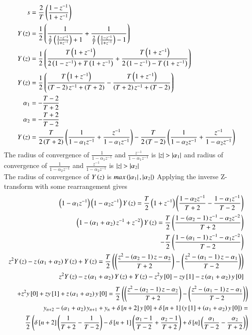 \documentclass[journal]{IEEEtran}
\begin{document}
\begin{align}
	s &= \frac{2}{T}\left(\frac{1-z^{-1}}{1+z^{-1}}\right)\\
	Y\left(z\right) &= \frac{1}{2}\left(\frac{1}{\frac{2}{T}\left(\frac{1-z^{-1}}{1+z^{-1}}\right)+1}+\frac{1}{\frac{2}{T}\left(\frac{1-z^{-1}}{1+z^{-1}}\right)-1}\right)\\
	Y\left(z\right) &= \frac{1}{2}\left(\frac{T\left(1+z^{-1}\right)}{2\left(1-z^{-1}\right)+T\left(1+z^{-1}\right)}+\frac{T\left(1+z^{-1}\right)}{2\left(1-z^{-1}\right)-T\left(1+z^{-1}\right)}\right)\\
	Y\left(z\right) &= \frac{1}{2}\left(\frac{T\left(1+z^{-1}\right)}{\left(T-2\right)z^{-1}+\left(T+2\right)} - \frac{T\left(1+z^{-1}\right)}{\left(T+2\right)z^{-1}+\left(T-2\right)}\right)\\
	\alpha_1 &= -\frac{T-2}{T+2}\\
	\alpha_2 &= -\frac{T+2}{T-2}\\ 
	Y\left(z\right) &= \frac{T}{2\left(T+2\right)}\left(\frac{1}{1-\alpha_1z^{-1}}+\frac{z^{-1}}{1-\alpha_1z^{-1}}\right)-\frac{T}{2\left(T-2\right)}\left(\frac{1}{1-\alpha_2z^{-1}}+\frac{z^{-1}}{1-\alpha_2z^{-1}}\right)
\end{align}
The radius of convergence of $\frac{1}{1-\alpha_1z^{-1}}$ and $\frac{z^{-1}}{1-\alpha_1z^{-1}}$ is $\left\vert z\right\vert>\left\vert\alpha_1\right\vert$ and radius of convergence of $\frac{1}{1-\alpha_2z^{-1}}$ and $\frac{z^{-1}}{1-\alpha_2z^{-1}}$ is $\left\vert z\right\vert>\left\vert\alpha_2\right\vert$\\
The radius of convergence of $Y\left(z\right)$ is $max\left(\left\vert\alpha_1\right\vert,\left\vert\alpha_2\right\vert\right)$\newline
Applying the inverse Z-transform with some rearrangement gives
\begin{align}
	\left(1-\alpha_1z^{-1}\right)\left(1-\alpha_2z^{-1}\right)Y\left(z\right) = \frac{T}{2}\left(1+z^{-1}\right)\left(\frac{1-\alpha_2z^{-1}}{T+2}-\frac{1-\alpha_1z^{-1}}{T-2}\right)\\
	\left(1-\left(\alpha_1+\alpha_2\right)z^{-1}+z^{-2}\right)Y\left(z\right) = \frac{T}{2}\left(\frac{1-\left(\alpha_2-1\right)z^{-1}-\alpha_2z^{-2}}{T+2}\right)\nonumber \\
  \qquad -\frac{T}{2}\left(\frac{1-\left(\alpha_1-1\right)z^{-1}-\alpha_1z^{-2}}{T-2}\right)\\
	z^2Y\left(z\right)-z\left(\alpha_1+\alpha_2\right)Y\left(z\right)+Y\left(z\right) = \frac{T}{2}\left(\left(\frac{z^2-\left(\alpha_2-1\right)z-\alpha_2}{T+2}\right)-\left(\frac{z^2-\left(\alpha_1-1\right)z-\alpha_1}{T-2}\right)\right)\\
	z^2Y\left(z\right)-z\left(\alpha_1+\alpha_2\right)Y\left(z\right)+Y\left(z\right) -z^2y{}\left[0\right] -zy{}\left[1\right] -z\left(\alpha_1+\alpha_2\right)y{}\left[0\right]\nonumber
\end{align}
\begin{align}
  \qquad+z^2y{}\left[0\right]+zy{}\left[1\right]+z\left(\alpha_1+\alpha_2\right)y{}\left[0\right] = \frac{T}{2}\left(\left(\frac{z^2-\left(\alpha_2-1\right)z-\alpha_2}{T+2}\right)-\left(\frac{z^2-\left(\alpha_1-1\right)z-\alpha_1}{T-2}\right)\right)\\
  y_{n+2}-\left(\alpha_1+\alpha_2\right)y_{n+1}+y_n+\delta{}\left[n+2\right]y{}\left[0\right]+\delta{}\left[n+1\right]\left(y{}\left[1\right]+\left(\alpha_1+\alpha_2\right)y{}\left[0\right]\right) = \nonumber \\
  \qquad\frac{T}{2}\left(\delta{}\left[n+2\right]\left(\frac{1}{T+2}-\frac{1}{T-2}\right)-\delta{}\left[n+1\right]\left(\frac{\alpha_1-1}{T-2}+\frac{\alpha_2-1}{T+2}\right)+\delta{}\left[n\right]\left(\frac{\alpha_1}{T-2}-\frac{\alpha_2}{T+2}\right)\right)
\end{align}
\end{document}
